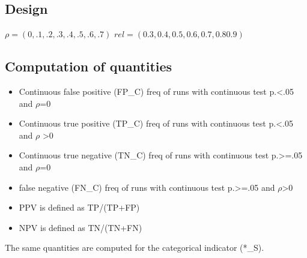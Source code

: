 \documentclass{article}
\begin{document}
\subsection*{Design}
\(\rho=(0,.1,.2,.3,.4,.5,.6,.7) \)
\(rel=(0.3, 0.4 ,0.5, 0.6, 0.7 ,0.8 0.9) \) 


\subsection*{Computation of quantities}

\begin{itemize}
  \item Continuous false positive (FP\_C)  freq of runs with continuous test p.<.05 and \(\rho\)=0  
  \item Continuous true positive (TP\_C)  freq of runs with continuous test p.<.05 and \(\rho\) >0
  \item Continuous true negative (TN\_C) freq of runs  with continuous test p.>=.05 and \(\rho\)=0
  \item false negative (FN\_C)  freq of runs  with continuous test p.>=.05 and \(\rho\)>0
  \item PPV is defined as TP/(TP+FP)
  \item NPV is defined as TN/(TN+FN)
\end{itemize}

The same quantities are computed for the categorical indicator (*\_S).
\end{document}
